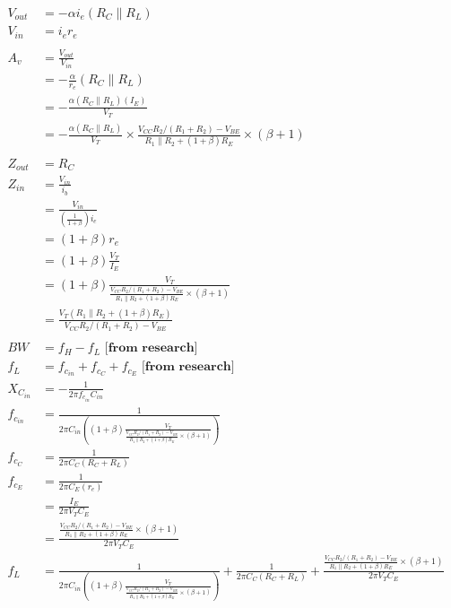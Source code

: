 \documentclass[11pt, a4paper]{article}
\begin{document}
\begin{align*}
V_{out} &= -\alpha i_e (R_C \parallel R_L)\\
V_{in} &= i_e r_e\\ \\
A_v &= \frac{V_{out}}{V_{in}}\\
 &= -\frac{\alpha}{r_e}(R_C \parallel R_L)\\
 &= -\frac{\alpha (R_C \parallel R_L)(I_E)}{V_T}\\
 &= -\frac{\alpha (R_C \parallel R_L)}{V_T} \times \frac{V_{CC}R_2/(R_1+R_2)-V_{BE}}{R_1 \parallel R_2 + (1+\beta)R_E} \times (\beta + 1)\\ \\
 Z_{out} &= R_C \\
 Z_{in} &= \frac{V_{in}}{i_b} \\
 &= \frac{V_{in}}{(\frac{1}{1+\beta})i_e}\\
 &= (1+\beta)r_e\\
 & = (1+\beta)\frac{V_T}{I_E}\\
 & = (1+\beta)\frac{V_T}{\frac{V_{CC}R_2/(R_1+R_2)-V_{BE}}{R_1 \parallel R_2 + (1+\beta)R_E} \times (\beta + 1)}\\
 & = \frac{V_T (R_1 \parallel R_2 + (1+\beta)R_E)}{V_{CC}R_2/(R_1+R_2)-V_{BE}}\\ \\
BW &= f_H - f_L \textbf{ [from research]}\\
f_L &= f_{c_{in}} + f_{c_C} + f_{c_E} \textbf{ [from research]}\\
X_{C_{in}} &= -\frac{1}{2\pi f_{c_{in}} C_{in}}\\ 
f_{c_{in}} &= \frac{1}{2\pi C_{in} ((1+\beta)\frac{V_T}{\frac{V_{CC}R_2/(R_1+R_2)-V_{BE}}{R_1 \parallel R_2 + (1+\beta)R_E} \times (\beta + 1)})}\\ 
f_{c_C} &= \frac{1}{2\pi C_C (R_C + R_L)}\\ 
f_{c_E} &= \frac{1}{2\pi C_E (r_e)}\\
&= \frac{I_E}{2\pi V_T C_E}\\
&= \frac{\frac{V_{CC}R_2/(R_1+R_2)-V_{BE}}{R_1 \parallel R_2 + (1+\beta)R_E} \times (\beta + 1)}{2\pi V_T C_E}\\
f_L &= \frac{1}{2\pi C_{in} ((1+\beta)\frac{V_T}{\frac{V_{CC}R_2/(R_1+R_2)-V_{BE}}{R_1 \parallel R_2 + (1+\beta)R_E} \times (\beta + 1)})} + \frac{1}{2\pi C_C (R_C + R_L)} + \frac{\frac{V_{CC}R_2/(R_1+R_2)-V_{BE}}{R_1 \parallel R_2 + (1+\beta)R_E} \times (\beta + 1)}{2\pi V_T C_E}\\ \\

\end{align*}
\end{document}
